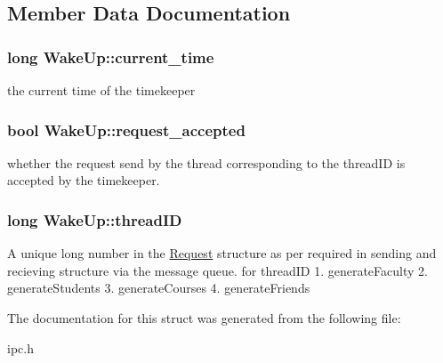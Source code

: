 \subsection{\-Member \-Data \-Documentation}
\hypertarget{structWakeUp_aac900a0e75f73fb4683c889020459be9}{
\subsubsection[{current\-\_\-time}]{\setlength{\rightskip}{0pt plus 5cm}long {\bf \-Wake\-Up\-::current\-\_\-time}}}\label{structWakeUp_aac900a0e75f73fb4683c889020459be9}
the current time of the timekeeper \hypertarget{structWakeUp_af12d17da0cc6f71e9794faffc3636dcd}{
\subsubsection[{request\-\_\-accepted}]{\setlength{\rightskip}{0pt plus 5cm}bool {\bf \-Wake\-Up\-::request\-\_\-accepted}}}\label{structWakeUp_af12d17da0cc6f71e9794faffc3636dcd}
whether the request send by the thread corresponding to the thread\-I\-D is accepted by the timekeeper. \hypertarget{structWakeUp_a940f846cbf0d72532d67c185ad7f0531}{
\subsubsection[{thread\-I\-D}]{\setlength{\rightskip}{0pt plus 5cm}long {\bf \-Wake\-Up\-::thread\-I\-D}}}\label{structWakeUp_a940f846cbf0d72532d67c185ad7f0531}
\-A unique long number in the \hyperlink{structRequest}{\-Request} structure as per required in sending and recieving structure via the message queue. for thread\-I\-D 1. generate\-Faculty 2. generate\-Students 3. generate\-Courses 4. generate\-Friends 

\-The documentation for this struct was generated from the following file\-:\begin{DoxyCompactItemize}
\item 
ipc.\-h\end{DoxyCompactItemize}
